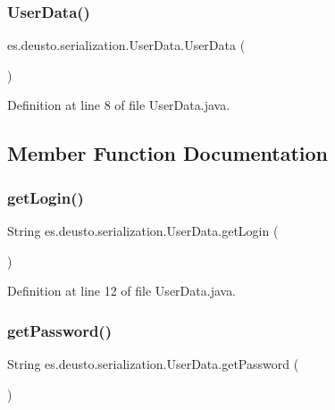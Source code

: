 \subsubsection{\texorpdfstring{UserData()}{UserData()}}
{\footnotesize\ttfamily es.\+deusto.\+serialization.\+User\+Data.\+User\+Data (\begin{DoxyParamCaption}{ }\end{DoxyParamCaption})}



Definition at line 8 of file User\+Data.\+java.



\subsection{Member Function Documentation}
\mbox{\label{classes_1_1deusto_1_1serialization_1_1_user_data_a6cb9be263b3577d3adbefc8af9d4fae8}} 
\subsubsection{\texorpdfstring{getLogin()}{getLogin()}}
{\footnotesize\ttfamily String es.\+deusto.\+serialization.\+User\+Data.\+get\+Login (\begin{DoxyParamCaption}{ }\end{DoxyParamCaption})}



Definition at line 12 of file User\+Data.\+java.

\mbox{\label{classes_1_1deusto_1_1serialization_1_1_user_data_abfa42147b4a2fe85f8c002a856069576}} 
\subsubsection{\texorpdfstring{getPassword()}{getPassword()}}
{\footnotesize\ttfamily String es.\+deusto.\+serialization.\+User\+Data.\+get\+Password (\begin{DoxyParamCaption}{ }\end{DoxyParamCaption})}



